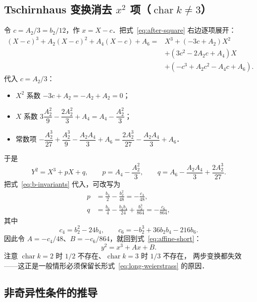 \documentclass[10pt,a4paper]{article}
\numberwithin{equation}{section}
\begin{document}
\subsection{Tschirnhaus 变换消去 $x^{2}$ 项（$\operatorname{char}k\neq3$）}

令 $c=A_{2}/3=b_{2}/12$，作 $x=X-c$．把式~\eqref{eq:after-square} 右边逐项展开：
\begin{align*}
(X-c)^{3}+A_{2}(X-c)^{2}+A_{4}(X-c)+A_{6}
={}&X^{3}+(-3c+A_{2})X^{2}\\
&+\left(3c^{2}-2A_{2}c+A_{4}\right)X\\
&+\left(-c^{3}+A_{2}c^{2}-A_{4}c+A_{6}\right).
\end{align*}
代入 $c=A_{2}/3$：
\begin{itemize}
\item $X^{2}$ 系数 $-3c+A_{2}=-A_{2}+A_{2}=0$；
\item $X$ 系数 $3\dfrac{A_{2}^{2}}{9}-\dfrac{2A_{2}^{2}}{3}+A_{4}=A_{4}-\dfrac{A_{2}^{2}}{3}$；
\item 常数项 $-\dfrac{A_{2}^{3}}{27}+\dfrac{A_{2}^{3}}{9}-\dfrac{A_{2}A_{4}}{3}+A_{6}
   =\dfrac{2A_{2}^{3}}{27}-\dfrac{A_{2}A_{4}}{3}+A_{6}$．
\end{itemize}
于是
\begin{equation}\label{eq:short-form-derived}
Y^{2}=X^{3}+pX+q,\qquad
p=A_{4}-\frac{A_{2}^{2}}{3},\qquad
q=A_{6}-\frac{A_{2}A_{4}}{3}+\frac{2A_{2}^{3}}{27}.
\end{equation}
把式~\eqref{eq:b-invariants} 代入，可改写为
\begin{align}
p&=\frac{b_{4}}{2}-\frac{b_{2}^{2}}{48}=-\frac{c_{4}}{48},\\
q&=\frac{b_{6}}{4}-\frac{b_{2}b_{4}}{24}+\frac{b_{2}^{3}}{864}=-\frac{c_{6}}{864},
\end{align}
其中
\begin{equation}\label{eq:c-invariants}
c_{4}=b_{2}^{2}-24b_{4},\qquad
c_{6}=-b_{2}^{3}+36b_{2}b_{4}-216b_{6}.
\end{equation}
因此令 $A=-c_{4}/48$、$B=-c_{6}/864$，就回到式~\eqref{eq:affine-short}：
\[
y^{2}=x^{3}+Ax+B .
\]
注意 $\operatorname{char}k=2$ 时 $1/2$ 不存在、$\operatorname{char}k=3$ 时 $1/3$ 不存在，
两步变换都失效——这正是一般情形必须保留长形式~\eqref{eq:long-weierstrass} 的原因．

\subsection{非奇异性条件的推导}\label{sec:singular}
\end{document}
